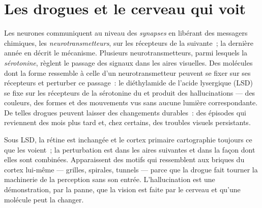 \section{Les drogues et le cerveau qui voit}

\begin{proposition}\label{prop:g11:vision-and-brain:drugs}
Les neurones communiquent au niveau des \emph{synapses} en libérant des
messagers chimiques, les \emph{neurotransmetteurs}, sur les récepteurs
de la  suivante~; la dernière année en décrit le mécanisme.
Plusieurs neurotransmetteurs, parmi lesquels la \emph{sérotonine},
règlent le passage des signaux dans les aires visuelles. Des molécules
dont la forme ressemble à celle d'un neurotransmetteur peuvent se fixer
sur ses récepteurs et perturber ce passage~: le diéthylamide de l'acide
lysergique (LSD) se fixe sur les récepteurs de la sérotonine du  et produit des hallucinations --- des couleurs, des formes et
des mouvements vus sans aucune lumière correspondante. De telles
drogues peuvent laisser des changements durables~: des épisodes qui
reviennent des mois plus tard et, chez certains, des troubles visuels
persistants.
\end{proposition}
\admitted

\begin{example}\label{ex:g11:vision-and-brain:hallucination}
Sous LSD, la rétine est inchangée et le cortex primaire cartographie
toujours ce que les  voient~; la perturbation est dans les aires
suivantes et dans la façon dont elles sont combinées. Apparaissent des
motifs qui ressemblent aux briques du cortex lui-même --- grilles,
spirales, tunnels --- parce que la drogue fait tourner la machinerie de
la perception sans son entrée. L'hallucination est une démonstration,
par la panne, que la vision est faite par le cerveau et qu'une molécule
peut la changer.
\end{example}

